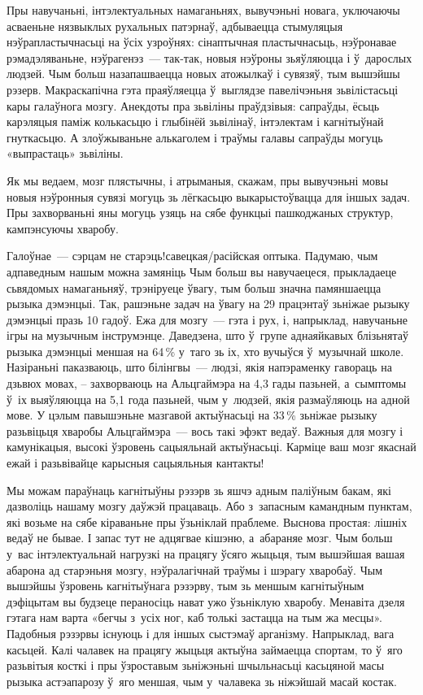 Пры навучаньні, інтэлектуальных намаганьнях, вывучэньні новага, уключаючы асваеньне нязвыклых рухальных патэрнаў, адбываецца стымуляцыя нэўрапластычнасьці на ўсіх узроўнях: сінаптычная пластычнасьць, нэўронавае рэмадэляваньне, нэўрагенэз~--- так-так, новыя нэўроны зьяўляюцца і ў~дарослых людзей. Чым больш назапашваецца новых атожылкаў і сувязяў, тым вышэйшы рэзерв. Макраскапічна гэта праяўляецца ў~выглядзе павелічэньня зьвілістасьці кары галаўнога мозгу. Анекдоты пра зьвіліны праўдзівыя: сапраўды, ёсьць карэляцыя паміж колькасьцю і глыбінёй зьвілінаў, інтэлектам і кагнітыўнай гнуткасьцю. А злоўжываньне алькаголем і траўмы галавы сапраўды могуць «выпрастаць» зьвіліны.

Як мы ведаем, мозг плястычны, і атрыманыя, скажам, пры вывучэньні мовы новыя нэўронныя сувязі могуць зь лёгкасьцю выкарыстоўвацца для іншых задач. Пры захворваньні яны могуць узяць на сябе функцыі пашкоджаных структур, кампэнсуючы хваробу.

Галоўнае~--- сэрцам не старэць!савецкая/расійская оптыка. Падумаю, чым адпаведным нашым можна замяніць Чым больш вы навучаецеся, прыкладаеце сьвядомых намаганьняў, трэніруеце ўвагу, тым больш значна памяншаецца рызыка дэмэнцыі. Так, рашэньне задач на ўвагу на 29 працэнтаў зьніжае рызыку дэмэнцыі празь 10 гадоў. Ежа для мозгу~--- гэта і рух, і, напрыклад, навучаньне ігры на музычным інструмэнце. Даведзена, што ў~групе аднаяйкавых блізьнятаў рызыка дэмэнцыі меншая на 64\,\% у~таго зь іх, хто вучыўся ў~музычнай школе. Назіраньні паказваюць, што білінгвы~--- людзі, якія напэраменку гавораць на дзьвюх мовах, -- захворваюць на Альцгаймэра на 4,3 гады пазьней, а~сымптомы ў~іх выяўляюцца на 5,1 года пазьней, чым у~людзей, якія размаўляюць на адной мове. У цэлым павышэньне мазгавой актыўнасьці на 33\,\% зьніжае рызыку разьвіцьця хваробы Альцгаймэра~--- вось такі эфэкт ведаў. Важныя для мозгу і камунікацыя, высокі ўзровень сацыяльнай актыўнасьці. Карміце ваш мозг якаснай ежай і разьвівайце карысныя сацыяльныя кантакты!

Мы можам параўнаць кагнітыўны рэзэрв зь яшчэ адным паліўным бакам, які дазволіць нашаму мозгу даўжэй працаваць. Або з~запасным камандным пунктам, які возьме на сябе кіраваньне пры ўзьніклай праблеме. Выснова простая: лішніх ведаў не бывае. І запас тут не адцягвае кішэню, а~абараняе мозг. Чым больш у~вас інтэлектуальнай нагрузкі на працягу ўсяго жыцьця, тым вышэйшая вашая абарона ад старэньня мозгу, нэўралагічнай траўмы і шэрагу хваробаў. Чым вышэйшы ўзровень кагнітыўнага рэзэрву, тым зь меншым кагнітыўным дэфіцытам вы будзеце пераносіць нават ужо ўзьніклую хваробу. Менавіта дзеля гэтага нам варта «бегчы з~усіх ног, каб толькі застацца на тым жа месцы». Падобныя рэзэрвы існуюць і для іншых сыстэмаў арганізму. Напрыклад, вага касьцей. Калі чалавек на працягу жыцьця актыўна займаецца спортам, то ў~яго разьвітыя косткі і пры ўзроставым зьніжэньні шчыльнасьці касьцяной масы рызыка астэапарозу ў~яго меншая, чым у~чалавека зь ніжэйшай масай костак.


